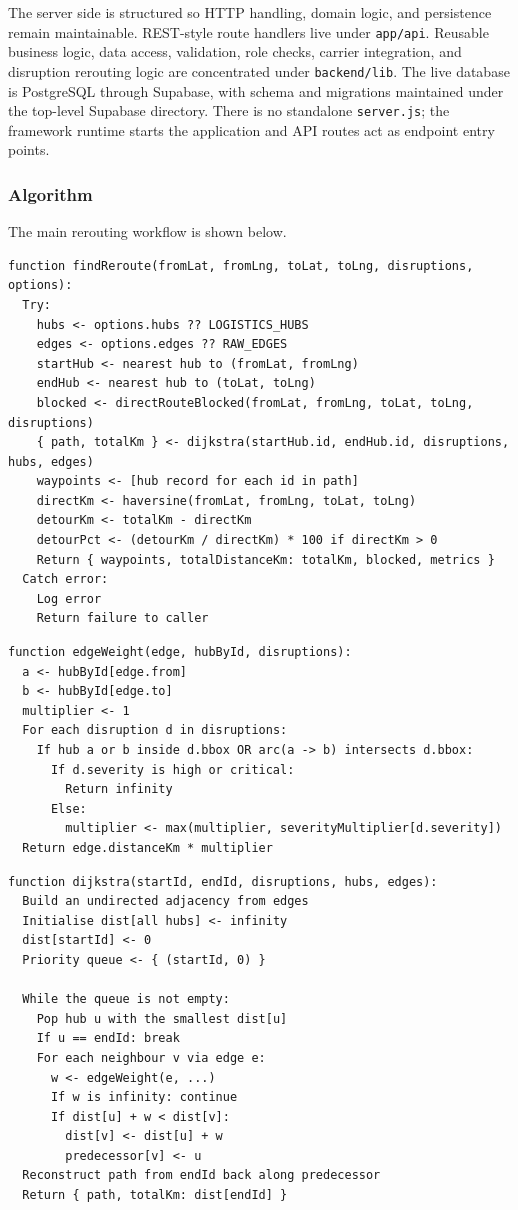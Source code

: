 The server side is structured so HTTP handling, domain logic, and persistence remain maintainable. REST-style route handlers live under \texttt{app/api}. Reusable business logic, data access, validation, role checks, carrier integration, and disruption rerouting logic are concentrated under \texttt{backend/lib}. The live database is PostgreSQL through Supabase, with schema and migrations maintained under the top-level Supabase directory. There is no standalone \texttt{server.js}; the framework runtime starts the application and API routes act as endpoint entry points.

\subsubsection{Algorithm}

The main rerouting workflow is shown below.

\begin{lstlisting}[caption={findReroute() pseudo-code}]
function findReroute(fromLat, fromLng, toLat, toLng, disruptions, options):
  Try:
    hubs <- options.hubs ?? LOGISTICS_HUBS
    edges <- options.edges ?? RAW_EDGES
    startHub <- nearest hub to (fromLat, fromLng)
    endHub <- nearest hub to (toLat, toLng)
    blocked <- directRouteBlocked(fromLat, fromLng, toLat, toLng, disruptions)
    { path, totalKm } <- dijkstra(startHub.id, endHub.id, disruptions, hubs, edges)
    waypoints <- [hub record for each id in path]
    directKm <- haversine(fromLat, fromLng, toLat, toLng)
    detourKm <- totalKm - directKm
    detourPct <- (detourKm / directKm) * 100 if directKm > 0
    Return { waypoints, totalDistanceKm: totalKm, blocked, metrics }
  Catch error:
    Log error
    Return failure to caller
\end{lstlisting}

\begin{lstlisting}[caption={edgeWeight() conceptual pseudo-code}]
function edgeWeight(edge, hubById, disruptions):
  a <- hubById[edge.from]
  b <- hubById[edge.to]
  multiplier <- 1
  For each disruption d in disruptions:
    If hub a or b inside d.bbox OR arc(a -> b) intersects d.bbox:
      If d.severity is high or critical:
        Return infinity
      Else:
        multiplier <- max(multiplier, severityMultiplier[d.severity])
  Return edge.distanceKm * multiplier
\end{lstlisting}

\begin{lstlisting}[caption={dijkstra() conceptual pseudo-code}]
function dijkstra(startId, endId, disruptions, hubs, edges):
  Build an undirected adjacency from edges
  Initialise dist[all hubs] <- infinity
  dist[startId] <- 0
  Priority queue <- { (startId, 0) }

  While the queue is not empty:
    Pop hub u with the smallest dist[u]
    If u == endId: break
    For each neighbour v via edge e:
      w <- edgeWeight(e, ...)
      If w is infinity: continue
      If dist[u] + w < dist[v]:
        dist[v] <- dist[u] + w
        predecessor[v] <- u
  Reconstruct path from endId back along predecessor
  Return { path, totalKm: dist[endId] }
\end{lstlisting}

